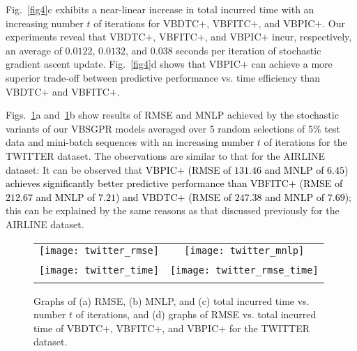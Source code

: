 \documentclass[conference]{IEEEtran}
\begin{document}
Fig.~\ref{fig4}c exhibits a near-linear increase in total incurred time with an increasing number $t$ of iterations for VBDTC$+$, VBFITC$+$, and VBPIC$+$. Our experiments reveal that VBDTC$+$, VBFITC$+$, and VBPIC$+$ incur, respectively, an average of $0.0122$, $0.0132$, and $0.038$ seconds per iteration of stochastic gradient ascent update. 
Fig.~\ref{fig4}d shows that VBPIC$+$ can achieve a more superior trade-off between predictive performance vs. time efficiency than VBDTC$+$ and VBFITC$+$. 
%

		Figs.~\ref{fig3}a and~\ref{fig3}b show results of RMSE and MNLP achieved by the stochastic variants of our VBSGPR models averaged over $5$ random selections of $5\%$ test data and mini-batch sequences with an increasing number $t$ of iterations for the TWITTER dataset. 
		The observations are similar to that for the AIRLINE dataset:
		It can be observed that \textcolor{black}{VBPIC$+$ (RMSE of $131.46$ and MNLP of $6.45$) achieves significantly better predictive performance than VBFITC$+$ (RMSE of $212.67$ and MNLP of $7.21$) and VBDTC$+$ (RMSE of $247.38$ and MNLP of $7.69$)}; 		
this can be explained by the same reasons as that discussed previously for the AIRLINE dataset.
	\begin{figure}
		\begin{tabular}{cc}
			\hspace{-2mm}\texttt{[image: twitter\_rmse]} &
			\hspace{-4mm}\texttt{[image: twitter\_mnlp]} 
			\vspace{-1mm}\\
			\hspace{-2mm}{(a)} & \hspace{-4mm}{(b)}
			\\
			\hspace{-2mm}\texttt{[image: twitter\_time]} &
			\hspace{-4mm}\texttt{[image: twitter\_rmse\_time]}
			\vspace{-1mm}\\
			\hspace{-2mm}{(c)} & \hspace{-4mm}{(d)}\vspace{-1mm}
		\end{tabular}
		\caption{Graphs of (a) RMSE, (b) MNLP, and (c) total incurred time vs. number $t$ of iterations, and (d) graphs of RMSE vs. total incurred time of VBDTC$+$, VBFITC$+$, and VBPIC$+$ for the TWITTER dataset.}
		\label{fig3}
	\end{figure}
		
\end{document}
